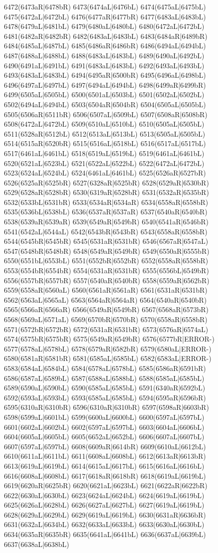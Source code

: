 6472(6473aR|6478bR) 6473(6474aL|6476bL) 6474(6475aL|6475bL) 6475(6472aL|6472bL) 6476(6477aR|6477bR) 6477(6483aL|6483bL) 6478(6479aL|6481bL) 6479(6480aL|6480bL) 6480(6472aL|6472bL) 6481(6482aR|6482bR) 6482(6483aL|6483bL) 6483(6484aR|6489bR) 6484(6485aL|6487bL) 6485(6486aR|6486bR) 6486(6494aL|6494bL) 6487(6488aL|6488bL) 6488(6483aL|6483bL) 6489(6490aL|6492bL) 6490(6491aL|6491bL) 6491(6483aL|6483bL) 6492(6493aL|6493bL) 6493(6483aL|6483bL) 6494(6495aR|6500bR) 6495(6496aL|6498bL) 6496(6497aL|6497bL) 6497(6494aL|6494bL) 6498(6499aR|6499bR) 6499(6505aL|6505bL) 6500(6501aL|6503bL) 6501(6502aL|6502bL) 6502(6494aL|6494bL) 6503(6504aR|6504bR) 6504(6505aL|6505bL) 6505(6506aR|6511bR) 6506(6507aL|6509bL) 6507(6508aR|6508bR) 6508(6472aL|6472bL) 6509(6510aL|6510bL) 6510(6505aL|6505bL) 6511(6528aR|6512bL) 6512(6513aL|6513bL) 6513(6505aL|6505bL) 6514(6515aR|6520bR) 6515(6516aL|6518bL) 6516(6517aL|6517bL) 6517(6461aL|6461bL) 6518(6519aL|6519bL) 6519(6461aL|6461bL) 6520(6521aL|6523bL) 6521(6522aL|6522bL) 6522(6472aL|6472bL) 6523(6524aL|6524bL) 6524(6461aL|6461bL) 6525(6526aR|6527bR) 6526(6525aR|6525bR) 6527(6328aR|6525bR) 6528(6529aR|6530bR) 6529(6528aR|6528bR) 6530(6319aR|6528bR) 6531(6532aR|6535bR) 6532(6533bL|6531bR) 6533(6534aR|6534aR) 6534(6558aR|6558bR) 6535(6536bL|6538bL) 6536(6537aR|6537aR) 6537(6540aR|6540bR) 6538(6539aR|6539aR) 6539(6549aR|6549bR) 6540(6541aR|6546bR) 6541(6542aL|6544aL) 6542(6543bR|6543bR) 6543(6558aR|6558bR) 6544(6545bR|6545bR) 6545(6531aR|6531bR) 6546(6567aR|6547aL) 6547(6548bR|6548bR) 6548(6549aR|6549bR) 6549(6550aR|6555bR) 6550(6551bL|6553bL) 6551(6552bR|6552bR) 6552(6558aR|6558bR) 6553(6554bR|6554bR) 6554(6531aR|6531bR) 6555(6556bL|6549bR) 6556(6557bR|6557bR) 6557(6540aR|6540bR) 6558(6559aR|6562bR) 6559(6558aR|6560aL) 6560(6561aR|6561aR) 6561(6531aR|6531bR) 6562(6563aL|6565aL) 6563(6564aR|6564aR) 6564(6540aR|6540bR) 6565(6566aR|6566aR) 6566(6549aR|6549bR) 6567(6568aR|6573bR) 6568(6569aL|6571aL) 6569(6570bR|6570bR) 6570(6558aR|6558bR) 6571(6572bR|6572bR) 6572(6531aR|6531bR) 6573(6576aR|6574aL) 6574(6575bR|6575bR) 6575(6549aR|6549bR) 6576(6577bR|ERROR-) 6577(6578aL|6578bL) 6578(6579aR|6582bR) 6579(6580aL|ERROR-) 6580(6581aR|6581bR) 6581(6585aL|6585bL) 6582(6583aL|ERROR-) 6583(6584aL|6584bL) 6584(6578aL|6578bL) 6585(6586aR|6591bR) 6586(6587aL|6589bL) 6587(6588aL|6588bL) 6588(6585aL|6585bL) 6589(6590aL|6590bL) 6590(6585aL|6585bL) 6591(6340aR|6592bL) 6592(6593aL|6593bL) 6593(6585aL|6585bL) 6594(6595aR|6596bR) 6595(6310aR|6310bR) 6596(6310aR|6310bR) 6597(6598aR|6603bR) 6598(6599aL|6601bL) 6599(6600aL|6600bL) 6600(6597aL|6597bL) 6601(6602aL|6602bL) 6602(6597aL|6597bL) 6603(6604aL|6606bL) 6604(6605aL|6605bL) 6605(6652aL|6652bL) 6606(6607aL|6607bL) 6607(6597aL|6597bL) 6608(6609aR|6614bR) 6609(6610aL|6612bL) 6610(6611aL|6611bL) 6611(6608aL|6608bL) 6612(6613aR|6613bR) 6613(6619aL|6619bL) 6614(6615aL|6617bL) 6615(6616aL|6616bL) 6616(6608aL|6608bL) 6617(6618aR|6618bR) 6618(6619aL|6619bL) 6619(6620aR|6625bR) 6620(6621aL|6623bL) 6621(6622aR|6622bR) 6622(6630aL|6630bL) 6623(6624aL|6624bL) 6624(6619aL|6619bL) 6625(6626aL|6628bL) 6626(6627aL|6627bL) 6627(6619aL|6619bL) 6628(6629aL|6629bL) 6629(6619aL|6619bL) 6630(6631aR|6636bR) 6631(6632aL|6634bL) 6632(6633aL|6633bL) 6633(6630aL|6630bL) 6634(6635aR|6635bR) 6635(6641aL|6641bL) 6636(6637aL|6639bL) 6637(6638aL|6638bL) 